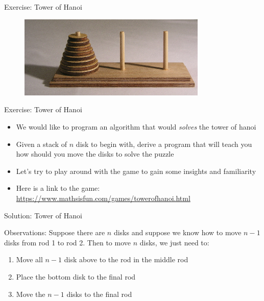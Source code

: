 \documentclass[10pt,xcolor={table,dvipsnames},t]{beamer}
\begin{document}
\begin{frame}{Exercise: Tower of Hanoi}
\begin{figure}
\includegraphics[width=0.8\textwidth]{img/hanoi.jpeg}
\end{figure}
\end{frame}

\begin{frame}{Exercise: Tower of Hanoi}
\begin{itemize}
\item We would like to program an algorithm that would \textit{solves} the tower of hanoi
\item Given a stack of $n$ disk to begin with, derive a program that will teach you how should you move the disks to solve the puzzle
\item Let's try to play around with the game to gain some insights and familiarity
\item Here is a link to the game: \href{https://www.mathsisfun.com/games/towerofhanoi.html}{https://www.mathsisfun.com/games/towerofhanoi.html}
\end{itemize}
\end{frame}

\begin{frame}{Solution: Tower of Hanoi}
\begin{exampleblock}{Observations:}
Suppose there are $n$ disks and suppose we know how to move $n-1$ disks from rod 1 to rod 2. Then to move $n$ disks, we just need to:
\begin{enumerate}
  \item Move all $n-1$ disk above to the rod in the middle rod
  \item Place the bottom disk to the final rod
  \item Move the $n-1$ disks to the final rod 
\end{enumerate}
\end{exampleblock}
\end{frame}
\end{document}

